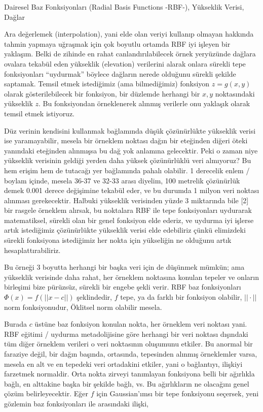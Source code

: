 \documentclass[12pt,fleqn]{article}\usepackage{../../common}
\begin{document}
Dairesel Baz Fonksiyonları (Radial Basis Functions -RBF-), Yükseklik Verisi, Dağlar

Ara değerlemek (interpolation), yani elde olan veriyi kullanıp olmayan hakkında
tahmin yapmaya uğraşmak için çok boyutlu ortamda RBF iyi işleyen bir
yaklaşım. Belki de zihinde en rahat canlandırılabilecek örnek yeryüzünde dağlara
ovalara tekabül eden yükseklik (elevation) verilerini alarak onlara sürekli tepe
fonksiyonları ``uydurmak'' böylece dağların nerede olduğunu sürekli şekilde
saptamak. Temsil etmek istediğimiz (ama bilmediğimiz) fonksiyon $z=g(x,y)$
olarak gösterilebilecek bir fonksiyon, bir düzlemde herhangi bir $x,y$
noktasındaki yükseklik $z$. Bu fonksiyondan örneklenerek alınmış verilerle onu
yaklaşık olarak temsil etmek istiyoruz.

Düz verinin kendisini kullanmak bağlamında düşük çözünürlükte yükseklik verisi
ise yaramayabilir, mesela bir örneklem noktası dağın bir eteğinden diğeri öteki
yanındaki eteğinden alınmışsa bu dağ yok anlamına gelecektir. Peki o zaman niye
yükseklik verisinin geldiği yerden daha yüksek çözünürlüklü veri almıyoruz?  Bu
hem erişim hem de tutacağı yer bağlamında pahalı olabilir. 1 derecelik enlem /
boylam içinde, mesela 36-37 ve 32-33 arası diyelim, 100 metrelik çözünürlük
demek 0.001 derece değişimine tekabül eder, ve bu durumda 1 milyon veri noktası
alınması gerekecektir. Halbuki yükseklik verisinden yüzde 3 miktarında bile [2]
bir rasgele örneklem alırsak, bu noktalara RBF ile tepe fonksiyonları uydurarak
matematiksel, sürekli olan bir genel fonksiyon elde ederiz, ve uydurma iyi
işlerse artık istediğimiz çözünürlükte yükseklik verisi elde edebiliriz çünkü
elimizdeki sürekli fonksiyona istediğimiz her nokta için yükseliğin ne olduğunu
artık hesaplattırabiliriz.

Bu örneği 3 boyutta herhangi bir başka veri için de düşünmek mümkün; ama
yükseklik verisinde daha rahat, her örneklem noktasına konulan tepeler ve
onların birleşimi bize pürüzsüz, sürekli bir engebe şekli verir. RBF baz
fonksiyonları $\Phi(x) = f(||x-c||)$ şeklindedir, $f$ tepe, ya da farklı bir
fonksiyon olabilir, $||\cdot||$ norm fonksiyonudur, Öklitsel norm olabilir
mesela.

Burada $c$ üstüne baz fonksiyon konulan nokta, her örneklem veri noktası
yani. RBF eğitimi / uydurma metadolijisine göre herhangi bir veri noktası
dışındaki tüm diğer örneklem verileri o veri noktasının oluşumunu etkiler. Bu
anormal bir faraziye değil, bir dağın başında, ortasında, tepesinden alınmış
örneklemler varsa, mesela en alt ve en tepedeki veri ortadakini etkiler, yani o
bağlantıyı, ilişkiyi farzetmek normaldir. Orta nokta zirveyi tanımlayan
fonksiyona belli bir ağırlıkla bağlı, en alttakine başka bir şekilde bağlı,
vs. Bu ağırlıkların ne olacağını genel çözüm belirleyecektir. Eğer $f$ için
Gaussian'ımsı bir tepe fonksiyonu seçersek, yeni gözlemin baz fonksiyonları ile
arasındaki ilişki,
\end{document}

